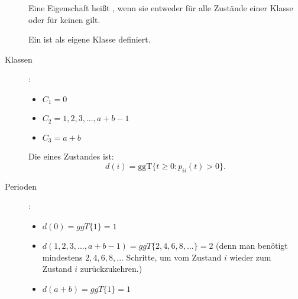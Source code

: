 \begin{uebsp}
\begin{Answer}
\begin{description}
\begin{uebsp_theory}
    Eine Eigenschaft heißt , wenn sie entweder für alle Zustände einer Klasse oder für keinen gilt.
\end{uebsp_theory}

\begin{uebsp_theory}
    Ein  ist als eigene Klasse definiert.
\end{uebsp_theory}

    \item [Klassen]:
        \begin{itemize}
            \item $C_1={0}$
            \item $C_2={1,2,3,...,a+b-1}$
            \item $C_3={a+b}$ 
        \end{itemize}

\begin{uebsp_theory}
    Die  eines Zustandes ist:
    \[d(i)=\mathrm{ggT}\{t\ge 0:p_{ii}(t)>0\}.\]
\end{uebsp_theory}

    \item [Perioden]:
        \begin{itemize}
            \item $d(0)=ggT\{1\}=1$
            \item $d({1,2,3,...,a+b-1})=ggT\{2,4,6,8,...\}=2$ (denn man benötigt mindestens $2,4,6,8,...$ Schritte, um vom Zustand $i$ wieder zum Zustand $i$ zurückzukehren.)
            \item $d(a+b)=ggT\{1\}=1$
        \end{itemize}
\end{description}
\end{Answer}
\end{uebsp}
